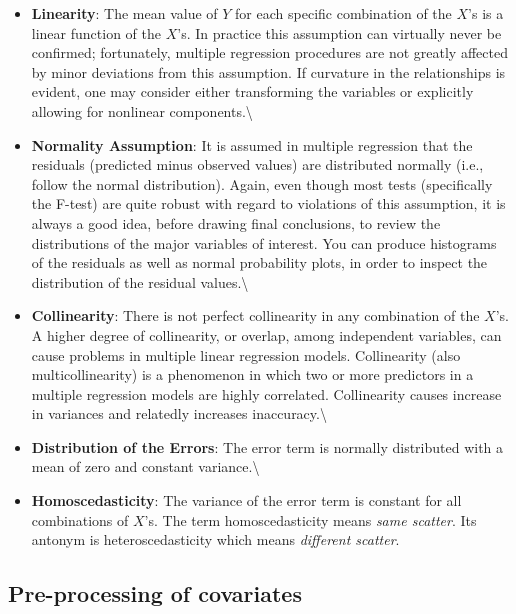 \documentclass[10pt,b5paper,]{book}
\theoremstyle{definition}
\theoremstyle{definition}
\theoremstyle{definition}
\theoremstyle{remark}
\begin{document}
\begin{itemize}
\item
  \textbf{Linearity}: The mean value of \(Y\) for each specific
  combination of the \(X\)'s is a linear function of the \(X\)'s. In
  practice this assumption can virtually never be confirmed;
  fortunately, multiple regression procedures are not greatly affected
  by minor deviations from this assumption. If curvature in the
  relationships is evident, one may consider either transforming the
  variables or explicitly allowing for nonlinear
  components.\textbackslash{}
\item
  \textbf{Normality Assumption}: It is assumed in multiple regression
  that the residuals (predicted minus observed values) are distributed
  normally (i.e., follow the normal distribution). Again, even though
  most tests (specifically the F-test) are quite robust with regard to
  violations of this assumption, it is always a good idea, before
  drawing final conclusions, to review the distributions of the major
  variables of interest. You can produce histograms of the residuals as
  well as normal probability plots, in order to inspect the distribution
  of the residual values.\textbackslash{}
\item
  \textbf{Collinearity}: There is not perfect collinearity in any
  combination of the \(X\)'s. A higher degree of collinearity, or
  overlap, among independent variables, can cause problems in multiple
  linear regression models. Collinearity (also multicollinearity) is a
  phenomenon in which two or more predictors in a multiple regression
  models are highly correlated. Collinearity causes increase in
  variances and relatedly increases inaccuracy.\textbackslash{}
\item
  \textbf{Distribution of the Errors}: The error term is normally
  distributed with a mean of zero and constant variance.\textbackslash{}
\item
  \textbf{Homoscedasticity}: The variance of the error term is constant
  for all combinations of \(X\)'s. The term homoscedasticity means
  \emph{same scatter}. Its antonym is heteroscedasticity which means
  \emph{different scatter}.
\end{itemize}

\hypertarget{pre-processing-of-covariates}{%
\subsection{Pre-processing of
covariates}\label{pre-processing-of-covariates}}
\end{document}
